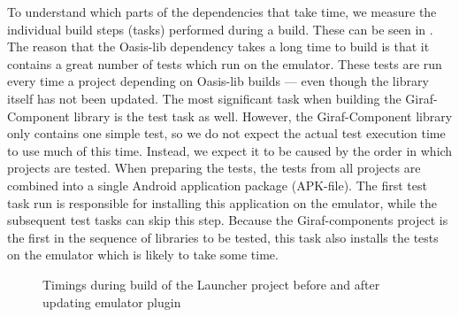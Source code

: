 To understand which parts of the dependencies that take time, we measure the individual build steps (tasks) performed during a build. These can be seen in . The reason that the Oasis-lib dependency takes a long time to build is that it contains a great number of tests which run on the emulator. These tests are run every time a project depending on Oasis-lib builds --- even though the library itself has not been updated. The most significant task when building the Giraf-Component library is the test task as well. However, the Giraf-Component library only contains one simple test, so we do not expect the actual test execution time to use much of this time. Instead, we expect it to be caused by the order in which projects are tested. When preparing the tests, the tests from all projects are combined into a single Android application package (APK-file). The first test task run is responsible for installing this application on the emulator, while the subsequent test tasks can skip this step. Because the Giraf-components project is the first in the sequence of libraries to be tested, this task also installs the tests on the emulator which is likely to take some time.
\begin{figure}
\centering
{}
\caption{Timings during build of the Launcher project before and after updating emulator plugin}\label{fig:launcher_build_times_1}
\end{figure}

